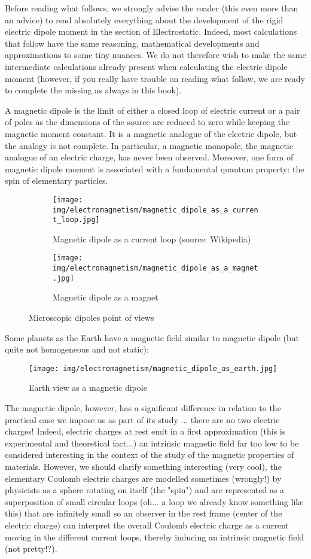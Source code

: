 	Before reading what follows, we strongly advise the reader (this even more than an advice) to read absolutely everything about the development of the rigid electric dipole moment in the section of Electrostatic. Indeed, most calculations that follow have the same reasoning, mathematical developments and approximations to some tiny nuances. We do not therefore wish to make the same intermediate calculations already present when calculating the electric dipole moment (however, if you really have trouble on reading what follow, we are ready to complete the missing as always in this book).
	
	A magnetic dipole is the limit of either a closed loop of electric current or a pair of poles as the dimensions of the source are reduced to zero while keeping the magnetic moment constant. It is a magnetic analogue of the electric dipole, but the analogy is not complete. In particular, a magnetic monopole, the magnetic analogue of an electric charge, has never been observed. Moreover, one form of magnetic dipole moment is associated with a fundamental quantum property: the spin of elementary particles.
	\begin{figure}[H]
	\centering
	\begin{subfigure}{.5\textwidth}
	  \centering
	  \texttt{[image: img/electromagnetism/magnetic\_dipole\_as\_a\_current\_loop.jpg]}
	  \caption[Magnetic dipole as a current loop]{Magnetic dipole as a current loop (source: Wikipedia)}
	\end{subfigure}
	\begin{subfigure}{.5\textwidth}
	  \centering
	  \texttt{[image: img/electromagnetism/magnetic\_dipole\_as\_a\_magnet.jpg]}
	  \caption{Magnetic dipole as a magnet}
	\end{subfigure}
	\caption{Microscopic dipoles point of views}
	\end{figure}
	Some planets as the Earth have a magnetic field similar to magnetic dipole (but quite not homogeneous and not static):
	\begin{figure}[H]
		\centering
		\texttt{[image: img/electromagnetism/magnetic\_dipole\_as\_earth.jpg]}
		\caption{Earth view as a magnetic dipole}
	\end{figure}
	
	The magnetic dipole, however, has a significant difference in relation to the practical case we impose us as part of its study ... there are no two electric charges! Indeed, electric charges at rest emit in a first approximation (this is experimental and theoretical fact...) an intrinsic magnetic field far too low to be considered interesting in the context of the study of the magnetic properties of materials. However, we should clarify something interesting (very cool), the elementary Coulomb electric charges are modelled sometimes (wrongly!) by physicists as a sphere rotating on itself (the "spin") and are represented as a superposition of small circular loops (oh... a loop we already know something like this) that are infinitely small so an observer in the rest frame (center of the electric charge) can interpret the overall Coulomb electric charge as a current moving in the different current loops, thereby inducing an intrinsic magnetic field (not pretty!?).
	
